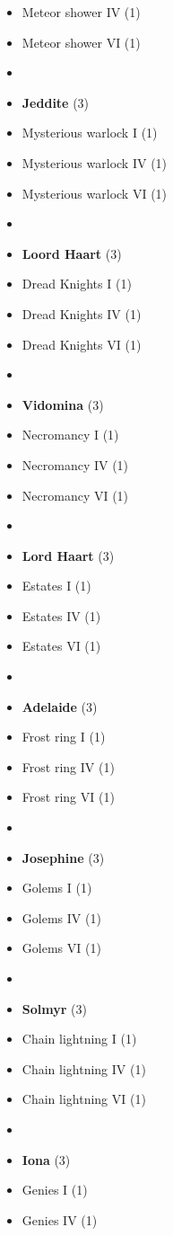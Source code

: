 \begin{multicols}{3}
\begin{itemize}[leftmargin=0pt, label={}, noitemsep, noitemsep]
  \item Meteor shower IV (1)
  \item Meteor shower VI (1)
  \item
  \item \textbf{Jeddite} (3)
  \item Mysterious warlock I (1)
  \item Mysterious warlock IV (1)
  \item Mysterious warlock VI (1)
  \item
  \item \textbf{Loord Haart} (3)
  \item Dread Knights I (1)
  \item Dread Knights IV (1)
  \item Dread Knights VI (1)
  \item
  \item \textbf{Vidomina} (3)
  \item Necromancy I (1)
  \item Necromancy IV (1)
  \item Necromancy VI (1)
  \item
  \item \textbf{Lord Haart} (3)
  \item Estates I (1)
  \item Estates IV (1)
  \item Estates VI (1)
  \item
  \item \textbf{Adelaide} (3)
  \item Frost ring I (1)
  \item Frost ring IV (1)
  \item Frost ring VI (1)
  \item
  \item \textbf{Josephine} (3)
  \item Golems I (1)
  \item Golems IV (1)
  \item Golems VI (1)
  \item
  \item \textbf{Solmyr} (3)
  \item Chain lightning I (1)
  \item Chain lightning IV (1)
  \item Chain lightning VI (1)
  \item
  \item \textbf{Iona} (3)
  \item Genies I (1)
  \item Genies IV (1)

\end{itemize}
\end{multicols}
